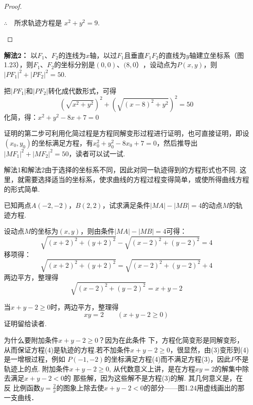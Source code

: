 \begin{solution}
\begin{proof}
\begin{enumerate}[(1)]
$\therefore\quad $所求轨迹方程是
$x^2+y^2=9$.
\end{enumerate}
\end{proof}

\textbf{解法2：}
以$F_1$、$F_2$的连线为$x$轴，以过$F_1$且垂直$F_1F_2$的直线为$y$轴建立坐标系（图1.23），则$F_1$、$F_2$的坐标分别是$(0,0)$、$(8,0）$，设动点为$P(x,y)$，则$|PF_1|^2+|PF_2|^2=50$. 

把$|PF_1|$和$|PF_2|$转化成代数形式，可得
\[\left(\sqrt{x^2+y^2}\right)^2+\left(\sqrt{(x-8)^2+y^2}\right)^2=50\]
化简，得：$x^2+y^2-8x+7=0$

证明的第二步可利用化简过程是方程同解变形过程进行证明，也可直接证明，即设$(x_0,y_0)$的坐标满足方程，有$x_0^2+y_0^2-8x_0+7=0$，然后推导出$|MF_1|^2+|MF_2|^2=50$，读者可以试一试.
\end{solution}

\begin{remark}
    解法1和解法2由于选择的坐标系不同，因此对同一轨迹得到的方程形式也不同. 这里，就需要选择适当的坐标系，使求曲线的方程过程变得简单，或使所得曲线方程的形式简单.
\end{remark}
 
\begin{example}
已知两点$A(-2,-2)$，$B(2,2)$，试求满足条件$|MA|-|MB|=4$的动点$M$的轨迹方程.
\end{example}
    
\begin{solution}
    设动点$M$的坐标为$(x,y)$，则由条件$|MA|-|MB|=4$可得：
\[\sqrt{(x+2)^2+(y+2)^2}-\sqrt{(x-2)^2+(y-2)^2}=4\]
移项得：
\[\sqrt{(x+2)^2+(y+2)^2}=\sqrt{(x-2)^2+(y-2)^2}+4\]
两边平方，整理得
\begin{equation}
    \sqrt{(x-2)^2+(y-2)^2}=x+y-2 \tag{3}
\end{equation}

当$x+y-2\ge 0$时，两边平方，整理得
\begin{equation}
    xy=2\qquad (x+y-2\ge 0) \tag{4}
\end{equation}
证明留给读者.
\end{solution}

\begin{remark}
    为什么要附加条件$x+y-2\ge 0$？因为在此条件
    下，方程化简变形是同解变形，从而保证方程(4)是轨迹的方程.若不加条件$x+y-2\ge 0$，很显然，由(3)变形到(4)是一增根过程，例如
    $P(-1,-2)$的坐标满足方程(4)而不满足方程(3)，因此$P$不是轨迹上的点. 附加条件$x+y-2\ge 0$, 从代数意义上讲，是在方程$xy=2$的解集中除去满足$x+y-2<0$的
    那些解，因为这些解不是方程(3)的解. 其几何意义是，在反 比例函数$y=\frac{2}{x}$的图象上除去使$x+y-2<0$的部分——图1.24用虚线画出的那一支曲线．
\end{remark}

